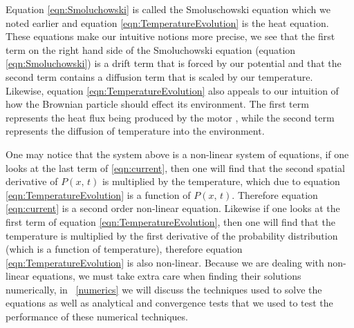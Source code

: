 Equation \ref{eqn:Smoluchowski} is called the Smoluschowski equation which we noted earlier and equation \ref{eqn:TemperatureEvolution} is the heat equation. These equations make our intuitive notions more precise, we see that the first term on the right hand side of the Smoluchowski equation (equation \ref{eqn:Smoluchowski}) is a drift term that is forced by our potential and that the second term contains a diffusion term that is scaled by our temperature. Likewise, equation \ref{eqn:TemperatureEvolution} also appeals to our intuition of how the Brownian particle should effect its environment. The first term represents the heat flux being produced by the motor \cite{M.W.Jack2016}, while the second term represents the diffusion of temperature into the environment.

One may notice that the system above is a non-linear system of equations, if one looks at the last term of \ref{eqn:current}, then one will find that the second spatial derivative of $P(x, \, t)$ is multiplied by the temperature, which due to equation \ref{eqn:TemperatureEvolution} is a function of $P(x, \, t)$. Therefore equation \ref{eqn:current} is a second order non-linear equation. Likewise if one looks at the first term of equation \ref{eqn:TemperatureEvolution}, then one will find that the temperature is multiplied by the first derivative of the probability distribution (which is a function of temperature), therefore equation \ref{eqn:TemperatureEvolution} is also non-linear. Because we are dealing with non-linear equations, we must take extra care when finding their solutions numerically, in ~\autoref{numerics} we will discuss the techniques used to solve the equations as well as analytical and convergence tests that we used to test the performance of these numerical techniques.

